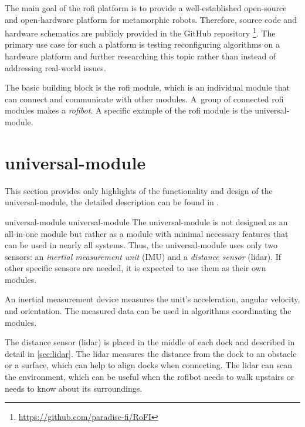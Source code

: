 \documentclass[
  digital,     %
  oneside,     %
  nosansbold,  %
  nocolorbold, %
  nolof,         %
  nolot,         %
]{fithesis4}
\newcommand{\TODO}[1]{#1} %
\newcommand{\TODOLIST}[1]{}
\begin{document}
The main goal of the \acrshort{rofi} platform is to provide a well-established open-source and
open-hardware platform for metamorphic robots. Therefore, source code and hardware schematics are
publicly provided in the GitHub repository \footnote{\url{https://github.com/paradise-fi/RoFI}}. The
primary use case for such a platform is testing reconfiguring algorithms on a hardware platform and
further researching this topic rather than instead of addressing real-world issues.

The basic building block is the \acrshort{rofi} module, which is an individual module that can
connect and communicate with other modules. A~group of connected \acrshort{rofi} modules makes a
\emph{\gls{rofibot}}. A specific example of the \acrshort{rofi} module is the
\gls{universal-module}.


\section[ Universal Module ]{ \gls{universal-module} }
\TODOLIST{
    \begin{itemize}
        \item ESP32
        \item \acrshort{spi}
        \item \acrshort{uart}
        \item accumulator
        \item EXT and INT power lines
        \item 3 motors
        \item 6 docks
    \end{itemize}
}
This section provides only highlights of the functionality and design of the \gls{universal-module},
the detailed description can be found in \cite[chapter~3]{Mrazek2019thesis}.

\gls{universal-module} \glsdesc{universal-module} The \gls{universal-module} is not designed as an
all-in-one module but rather as a module with minimal necessary features that can be used in nearly
all systems. Thus, the \gls{universal-module} uses only two sensors: an \emph{inertial measurement
unit} (IMU) and a \emph{distance sensor} (\acrshort{lidar}). If other specific sensors are needed,
it is expected to use them as their own modules.

An inertial measurement device measures the unit's acceleration, angular velocity, and orientation.
The measured data can be used in algorithms coordinating the modules.

The distance sensor (\acrshort{lidar}) is placed in the middle of each dock and described in detail
in \autoref{sec:lidar}. The \acrshort{lidar} measures the distance from the dock to an obstacle or a
surface, which can help to align docks when connecting. The \acrshort{lidar} can scan the
environment, which can be useful when the \gls{rofibot} needs to walk upstairs or needs to know
about its surroundings.
\end{document}
